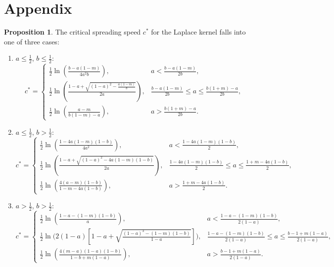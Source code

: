 \documentclass[11pt]{article}
\theoremstyle{definition}
\newtheorem{prop}[thm]{Proposition}
\numberwithin{equation}{section}
\numberwithin{thm}{section}
\renewcommand{\a}{a}
\renewcommand{\b}{b}
\newcommand{\m}{m}
\begin{document}
\section{Appendix}



\begin{prop}\label{laplacespeedcalculations}
The critical spreading speed $c^*$ for the Laplace kernel falls into one of three cases:
\begin{enumerate}[{Case} 1.]

\item $\a\leq\frac{1}{2}$, $\b\leq\frac{1}{2}$:
$$
c^* = \begin{cases}
\frac{1}{2} \ln \left( \frac{\b-\a(1-\m)}{4\a^2\b} \right), & \a < \frac{\b-\a(1-\m)}{2\b}, \\
\frac{1}{2} \ln \left( \frac{1-\a + \sqrt{(1-\a)^2 - \frac{\a(1-\m)}{\b}}}{2\a} \right), & \frac{\b-\a(1-\m)}{2\b} \leq \a \leq \frac{\b(1+\m)-\a}{2\b}, \\
\frac{1}{2} \ln \left( \frac{\a-\m}{\b(1-\m)-\a}\right), & \a > \frac{\b(1+\m)-\a}{2\b}.
\end{cases}
$$


\item $\a\leq\frac{1}{2}$, $\b>\frac{1}{2}$:
$$
c^* = \begin{cases}
\frac{1}{2} \ln \left( \frac{1-4\a(1-\m)(1-\b)}{4\a^2} \right), & a<\frac{1-4\a(1-\m)(1-\b)}{2}, \\
\frac{1}{2} \ln \left( \frac{1-\a + \sqrt{(1-\a)^2 - 4\a(1-\m)(1-\b)}}{2\a} \right), & \frac{1-4\a(1-\m)(1-\b)}{2}\leq\a\leq\frac{1+\m-4\a(1-\b)}{2}, \\
\frac{1}{2} \ln \left( \frac{4(\a-\m)(1-\b)}{1-\m-4\a(1-\b)}\right), & \a>\frac{1+\m-4\a(1-\b)}{2}.
\end{cases}
$$


\item $\a>\frac{1}{2}$, $\b>\frac{1}{2}$:
$$
c^* = \begin{cases}
\frac{1}{2} \ln \left( \frac{1-\a-(1-\m)(1-\b)}{\a} \right), & \a<\frac{1-\a-(1-\m)(1-\b)}{2(1-\a)}, \\
\frac{1}{2} \ln \Big( 2(1-\a)\left[1-\a + \sqrt{\frac{(1-\a)^3-(1-\m)(1-\b) }{1-\a}}\right] \Big), & \frac{1-\a-(1-\m)(1-\b)}{2(1-\a)}\leq\a\leq\frac{\b-1+\m(1-\a)}{2(1-\a)}, \\
\frac{1}{2} \ln \left( \frac{4(\m-\a)(1-\a)(1-\b)}{1-\b+\m(1-\a)}\right), & \a>\frac{\b-1+\m(1-\a)}{2(1-\a)}.
\end{cases}
$$

\end{enumerate}
\end{prop}
\end{document}
